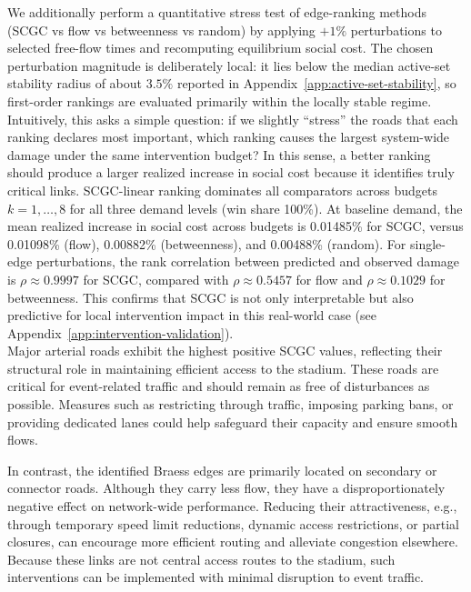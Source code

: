 \documentclass[twocolumn,english,groupedaddress, superscriptaddress,aps,pre,10pt,floatfix]{revtex4-2}
\begin{document}
We additionally perform a quantitative stress test of edge-ranking methods (SCGC vs flow vs betweenness vs random) by applying $+1\%$ perturbations to selected free-flow times and recomputing equilibrium social cost. 
The chosen perturbation magnitude is deliberately local: it lies below the median active-set stability radius of about $3.5\%$ reported in Appendix~\ref{app:active-set-stability}, so first-order rankings are evaluated primarily within the locally stable regime.
Intuitively, this asks a simple question: if we slightly ``stress'' the roads that each ranking declares most important, which ranking causes the largest system-wide damage under the same intervention budget? 
In this sense, a better ranking should produce a larger realized increase in social cost because it identifies truly critical links.
SCGC-linear ranking dominates all comparators across budgets $k=1,\dots,8$ for all three demand levels (win share 100\%). 
At baseline demand, the mean realized increase in social cost across budgets is 0.01485\% for SCGC, versus 0.01098\% (flow), 0.00882\% (betweenness), and 0.00488\% (random). 
For single-edge perturbations, the rank correlation between predicted and observed damage is $\rho\approx0.9997$ for SCGC, compared with $\rho\approx0.5457$ for flow and $\rho\approx0.1029$ for betweenness. 
This confirms that SCGC is not only interpretable but also predictive for local intervention impact in this real-world case (see Appendix~\ref{app:intervention-validation}).\\

Major arterial roads exhibit the highest positive SCGC values, reflecting their structural role in maintaining efficient access to the stadium. 
These roads are critical for event-related traffic and should remain as free of disturbances as possible. 
Measures such as restricting through traffic, imposing parking bans, or providing dedicated lanes could help safeguard their capacity and ensure smooth flows. 

In contrast, the identified Braess edges are primarily located on secondary or connector roads. 
Although they carry less flow, they have a disproportionately negative effect on network-wide performance. 
Reducing their attractiveness, e.g., through temporary speed limit reductions, dynamic access restrictions, or partial closures, can encourage more efficient routing and alleviate congestion elsewhere. 
Because these links are not central access routes to the stadium, such interventions can be implemented with minimal disruption to event traffic.\\
\end{document}
